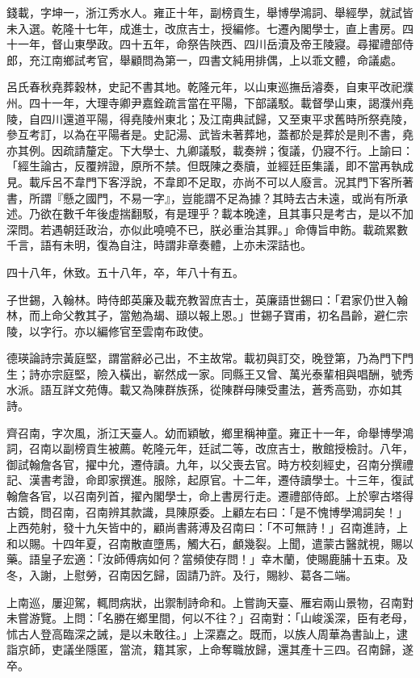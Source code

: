 \begin{pinyinscope}
錢載，字坤一，浙江秀水人。雍正十年，副榜貢生，舉博學鴻詞、舉經學，就試皆未入選。乾隆十七年，成進士，改庶吉士，授編修。七遷內閣學士，直上書房。四十一年，督山東學政。四十五年，命祭告陜西、四川岳瀆及帝王陵寢。尋擢禮部侍郎，充江南鄉試考官，舉顧問為第一，四書文純用排偶，上以乖文體，命議處。

呂氏春秋堯葬穀林，史記不書其地。乾隆元年，以山東巡撫岳濬奏，自東平改祀濮州。四十一年，大理寺卿尹嘉銓疏言當在平陽，下部議駁。載督學山東，謁濮州堯陵，自四川還道平陽，得堯陵州東北；及江南典試歸，又至東平求舊時所祭堯陵，參互考訂，以為在平陽者是。史記湯、武皆未著葬地，蓋都於是葬於是則不書，堯亦其例。因疏請釐定。下大學士、九卿議駁，載奏辨；復議，仍寢不行。上諭曰：「經生論古，反覆辨證，原所不禁。但既陳之奏牘，並經廷臣集議，即不當再執成見。載斥呂不韋門下客浮說，不韋即不足取，亦尚不可以人廢言。況其門下客所著書，所謂『懸之國門，不易一字』，豈能謂不足為據？其時去古未遠，或尚有所承述。乃欲在數千年後虛揣翻駁，有是理乎？載本晚達，且其事只是考古，是以不加深問。若遇朝廷政治，亦似此嘵嘵不已，朕必重治其罪。」命傳旨申飭。載疏累數千言，語有未明，復為自注，時謂非章奏體，上亦未深詰也。

四十八年，休致。五十八年，卒，年八十有五。

子世錫，入翰林。時侍郎英廉及載充教習庶吉士，英廉語世錫曰：「君家仍世入翰林，而上命父教其子，當勉為朅、頲以報上恩。」世錫子寶甫，初名昌齡，避仁宗陵，以字行。亦以編修官至雲南布政使。

德瑛論詩宗黃庭堅，謂當辭必己出，不主故常。載初與訂交，晚登第，乃為門下門生；詩亦宗庭堅，險入橫出，嶄然成一家。同縣王又曾、萬光泰輩相與唱酬，號秀水派。語互詳文苑傳。載又為陳群族孫，從陳群母陳受畫法，蒼秀高勁，亦如其詩。

齊召南，字次風，浙江天臺人。幼而穎敏，鄉里稱神童。雍正十一年，命舉博學鴻詞，召南以副榜貢生被薦。乾隆元年，廷試二等，改庶吉士，散館授檢討。八年，御試翰詹各官，擢中允，遷侍讀。九年，以父喪去官。時方校刻經史，召南分撰禮記、漢書考證，命即家撰進。服除，起原官。十二年，遷侍讀學士。十三年，復試翰詹各官，以召南列首，擢內閣學士，命上書房行走。遷禮部侍郎。上於寧古塔得古鏡，問召南，召南辨其款識，具陳原委。上顧左右曰：「是不愧博學鴻詞矣！」上西苑射，發十九矢皆中的，顧尚書蔣溥及召南曰：「不可無詩！」召南進詩，上和以賜。十四年夏，召南散直墮馬，觸大石，顱幾裂。上聞，遣蒙古醫就視，賜以藥。語皇子宏適：「汝師傅病如何？當頻使存問！」幸木蘭，使賜鹿脯十五束。及冬，入謝，上慰勞，召南因乞歸，固請乃許。及行，賜紗、葛各二端。

上南巡，屢迎駕，輒問病狀，出禦制詩命和。上嘗詢天臺、雁宕兩山景物，召南對未嘗游覽。上問：「名勝在鄉里間，何以不往？」召南對：「山峻溪深，臣有老母，怵古人登高臨深之誡，是以未敢往。」上深嘉之。既而，以族人周華為書訕上，逮詣京師，吏議坐隱匿，當流，籍其家，上命奪職放歸，還其產十三四。召南歸，遂卒。


\end{pinyinscope}

